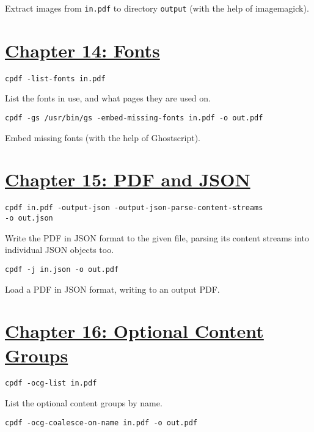 \documentclass{book}
\begin{document}
\noindent Extract images from \texttt{in.pdf} to directory \texttt{output} (with the help of imagemagick).


\section*{\hyperref[chap:14]{Chapter 14: Fonts}}

\begin{framed}\noindent\texttt{cpdf -list-fonts in.pdf}\end{framed}

\noindent List the fonts in use, and what pages they are used on.

\begin{framed}\noindent\texttt{cpdf -gs /usr/bin/gs -embed-missing-fonts in.pdf -o out.pdf}\end{framed}

\noindent Embed missing fonts (with the help of Ghostscript).

\section*{\hyperref[chap:15]{Chapter 15: PDF and JSON}}

\begin{framed}\noindent\texttt{cpdf in.pdf -output-json -output-json-parse-content-streams\\\phantom{\ \ \ \ } -o out.json}\end{framed}

\noindent Write the PDF in JSON format to the given file, parsing its content streams into individual JSON objects too.

\begin{framed}\noindent\texttt{cpdf -j in.json -o out.pdf}\end{framed}

\noindent Load a PDF in JSON format, writing to an output PDF.

\section*{\hyperref[chap:16]{Chapter 16: Optional Content Groups}}

\begin{framed}\noindent\texttt{cpdf -ocg-list in.pdf}\end{framed}

\noindent List the optional content groups by name.

\begin{framed}\noindent\texttt{cpdf -ocg-coalesce-on-name in.pdf -o out.pdf}\end{framed}
\end{document}
